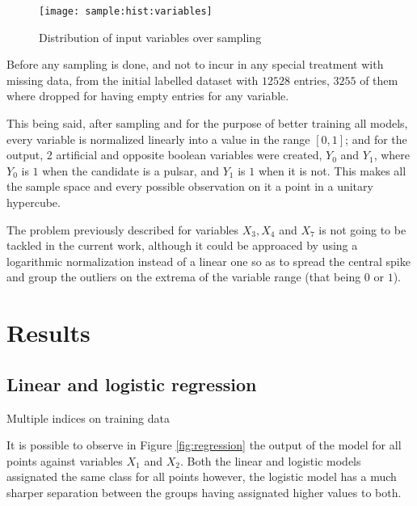 \documentclass[journal]{IEEEtran}
\begin{document}
\begin{figure*}[ht]
    \texttt{[image: sample:hist:variables]}
    \caption{Distribution of input variables over sampling \label{fig:sample:hist:variables}}
\end{figure*}

Before any sampling is done, and not to incur in any special treatment with
missing data, from the initial labelled dataset with $12528$ entries, $3255$ of
them where dropped for having empty entries for any variable. 

This being said, after sampling and for the purpose of better training all
models, every variable is normalized linearly into a value in the range $[0,1]$;
and for the output, 2 artificial and opposite boolean variables were created,
$Y_0$ and $Y_1$, where $Y_0$ is $1$ when the candidate is a pulsar, and $Y_1$ is
$1$ when it is not. This makes all the sample space and every possible
observation on it a point in a unitary hypercube.

The problem previously described for variables $X_3, X_4$ and $X_7$ is not going
to be tackled in the current work, although it could be approaced by using a
logarithmic normalization instead of a linear one so as to spread the central
spike and group the outliers on the extrema of the variable range (that being
$0$ or $1$).

\section{Results}

\subsection{Linear and logistic regression}

\begin{table*}
    {\csvlinetotablerow}%
    \caption{Multiple indices on training data\label{tab:index}}
\end{table*}

It is possible to observe in Figure \ref{fig:regression} the output of the model
for all points against variables $X_1$ and $X_2$. Both the linear and logistic
models assignated the same class for all points however, the logistic model has
a much sharper separation between the groups having assignated higher values
to both.
\end{document}
